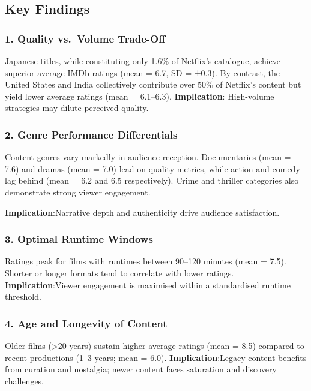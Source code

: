 \documentclass[
  man,floatsintext]{apa6}
\begin{document}
\subsection{Key Findings}\label{key-findings}

\subsubsection{1. Quality vs.~Volume Trade-Off}\label{quality-vs.-volume-trade-off}

Japanese titles, while constituting only 1.6\% of Netflix's catalogue, achieve superior average IMDb ratings (mean = 6.7, SD = ±0.3). By contrast, the United States and India collectively contribute over 50\% of Netflix's content but yield lower average ratings (mean = 6.1--6.3).
\textbf{Implication}: High-volume strategies may dilute perceived quality.

\subsubsection{2. Genre Performance Differentials}\label{genre-performance-differentials}

Content genres vary markedly in audience reception. Documentaries (mean = 7.6) and dramas (mean = 7.0) lead on quality metrics, while action and comedy lag behind (mean = 6.2 and 6.5 respectively). Crime and thriller categories also demonstrate strong viewer engagement.

\textbf{Implication}:Narrative depth and authenticity drive audience satisfaction.

\subsubsection{3. Optimal Runtime Windows}\label{optimal-runtime-windows}

Ratings peak for films with runtimes between 90--120 minutes (mean = 7.5). Shorter or longer formats tend to correlate with lower ratings.
\textbf{Implication}:Viewer engagement is maximised within a standardised runtime threshold.

\subsubsection{4. Age and Longevity of Content}\label{age-and-longevity-of-content}

Older films (\textgreater20 years) sustain higher average ratings (mean = 8.5) compared to recent productions (1--3 years; mean = 6.0).
\textbf{Implication}:Legacy content benefits from curation and nostalgia; newer content faces saturation and discovery challenges.
\end{document}
